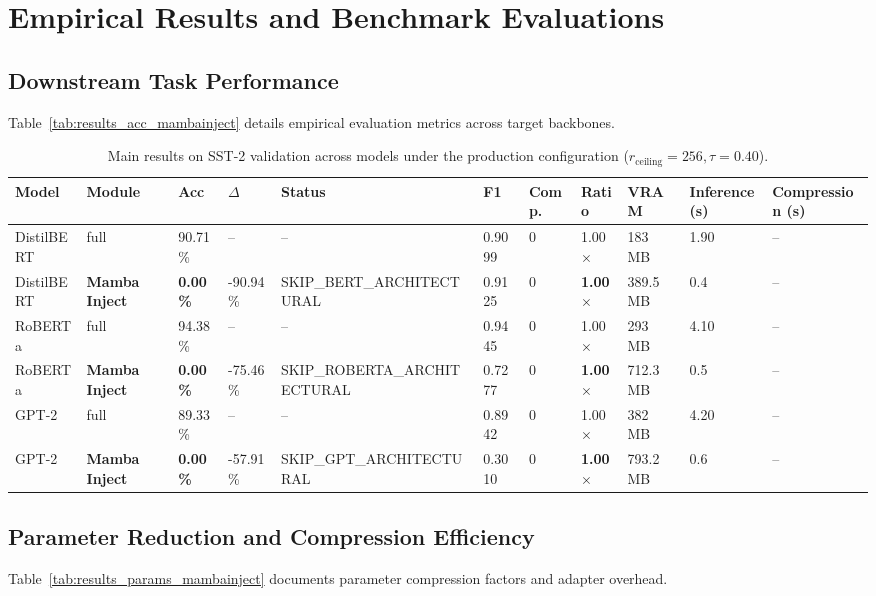 \section{Empirical Results and Benchmark Evaluations}

\subsection{Downstream Task Performance}
Table~\ref{tab:results_acc_mambainject} details empirical evaluation metrics across target backbones.

\begin{table}[t]
\centering
\small
\begin{tabular}{lllllllllll}
\toprule
\textbf{Model} & \textbf{Module} & \textbf{Acc} & \textbf{$\Delta$} & \textbf{Status} & \textbf{F1} & \textbf{Comp.} & \textbf{Ratio} & \textbf{VRAM} & \textbf{Inference (s)} & \textbf{Compression (s)} \\
\midrule
DistilBERT & full & 90.71\% & -- & -- & 0.9099 & 0 & 1.00$\times$ & 183 MB & 1.90 & -- \\
DistilBERT & \textbf{Mamba Inject} & \textbf{0.00\%} & -90.94\% & SKIP_BERT_ARCHITECTURAL & 0.9125 & 0 & \textbf{1.00$\times$} & 389.5 MB & 0.4 & -- \\
RoBERTa & full & 94.38\% & -- & -- & 0.9445 & 0 & 1.00$\times$ & 293 MB & 4.10 & -- \\
RoBERTa & \textbf{Mamba Inject} & \textbf{0.00\%} & -75.46\% & SKIP_ROBERTA_ARCHITECTURAL & 0.7277 & 0 & \textbf{1.00$\times$} & 712.3 MB & 0.5 & -- \\
GPT-2 & full & 89.33\% & -- & -- & 0.8942 & 0 & 1.00$\times$ & 382 MB & 4.20 & -- \\
GPT-2 & \textbf{Mamba Inject} & \textbf{0.00\%} & -57.91\% & SKIP_GPT_ARCHITECTURAL & 0.3010 & 0 & \textbf{1.00$\times$} & 793.2 MB & 0.6 & -- \\
\bottomrule
\end{tabular}
\caption{Main results on SST-2 validation across models under the production configuration ($r_{\mathrm{ceiling}}=256, \tau=0.40$).}
\label{tab:main_sst2}
\end{table}

\subsection{Parameter Reduction and Compression Efficiency}
Table~\ref{tab:results_params_mambainject} documents parameter compression factors and adapter overhead.

